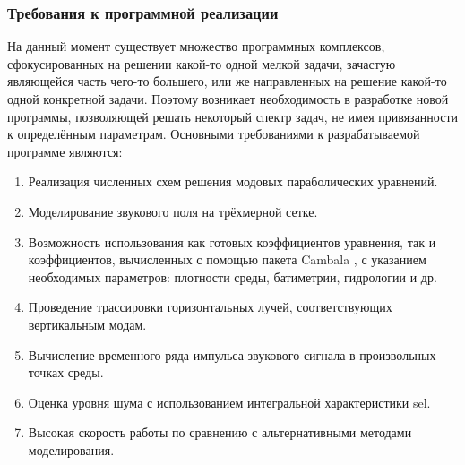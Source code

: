 \documentclass[../document.tex]{subfiles}
\begin{document}
			\subsubsection{Требования к программной реализации}
				\par На данный момент существует множество программных комплексов, сфокусированных на решении какой-то одной мелкой задачи, зачастую являющейся часть чего-то большего, или же направленных на решение какой-то одной конкретной задачи. Поэтому возникает необходимость в разработке новой программы, позволяющей решать некоторый спектр задач, не имея привязанности к определённым параметрам. Основными требованиями к разрабатываемой программе являются:
				\begin{enumerate}
					\item Реализация численных схем решения модовых параболических уравнений.
					\item Моделирование звукового поля на трёхмерной сетке.
					\item Возможность использования как готовых коэффициентов уравнения, так
					и коэффициентов, вычисленных с помощью пакета Cambala \cite{cambala}, с указанием необхо­димых параметров: плотности среды, батиметрии, гидрологии и др.
					\item Проведение трассировки горизонтальных лучей, соответствующих вертикальным модам.
					\item Вычисление временного ряда импульса звукового сигнала в произвольных точках среды.
					\item Оценка уровня шума с использованием интегральной характеристики \acrshort{sel}.
					\item Высокая скорость работы по сравнению с альтернативными методами моделирования.
				\end{enumerate}
\end{document}

